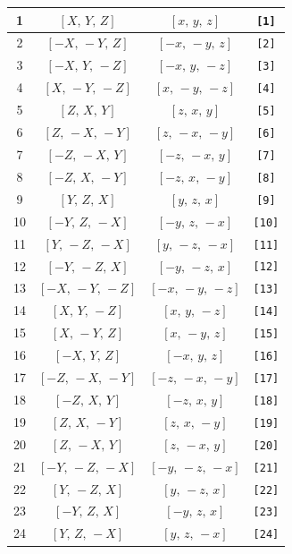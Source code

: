 \documentclass[fleqn,8pt]{jsarticle}
\begin{document}
\begin{longtable}{cccc}
1 & $\left[ X,\, Y,\, Z \right]$ & $\left[ x,\, y,\, z \right]$ & {\tt [1]} \\ \hline
2 & $\left[ - X,\, - Y,\, Z \right]$ & $\left[ - x,\, - y,\, z \right]$ & {\tt [2]} \\ \hline
3 & $\left[ - X,\, Y,\, - Z \right]$ & $\left[ - x,\, y,\, - z \right]$ & {\tt [3]} \\ \hline
4 & $\left[ X,\, - Y,\, - Z \right]$ & $\left[ x,\, - y,\, - z \right]$ & {\tt [4]} \\ \hline
5 & $\left[ Z,\, X,\, Y \right]$ & $\left[ z,\, x,\, y \right]$ & {\tt [5]} \\ \hline
6 & $\left[ Z,\, - X,\, - Y \right]$ & $\left[ z,\, - x,\, - y \right]$ & {\tt [6]} \\ \hline
7 & $\left[ - Z,\, - X,\, Y \right]$ & $\left[ - z,\, - x,\, y \right]$ & {\tt [7]} \\ \hline
8 & $\left[ - Z,\, X,\, - Y \right]$ & $\left[ - z,\, x,\, - y \right]$ & {\tt [8]} \\ \hline
9 & $\left[ Y,\, Z,\, X \right]$ & $\left[ y,\, z,\, x \right]$ & {\tt [9]} \\ \hline
10 & $\left[ - Y,\, Z,\, - X \right]$ & $\left[ - y,\, z,\, - x \right]$ & {\tt [10]} \\ \hline
11 & $\left[ Y,\, - Z,\, - X \right]$ & $\left[ y,\, - z,\, - x \right]$ & {\tt [11]} \\ \hline
12 & $\left[ - Y,\, - Z,\, X \right]$ & $\left[ - y,\, - z,\, x \right]$ & {\tt [12]} \\ \hline
13 & $\left[ - X,\, - Y,\, - Z \right]$ & $\left[ - x,\, - y,\, - z \right]$ & {\tt [13]} \\ \hline
14 & $\left[ X,\, Y,\, - Z \right]$ & $\left[ x,\, y,\, - z \right]$ & {\tt [14]} \\ \hline
15 & $\left[ X,\, - Y,\, Z \right]$ & $\left[ x,\, - y,\, z \right]$ & {\tt [15]} \\ \hline
16 & $\left[ - X,\, Y,\, Z \right]$ & $\left[ - x,\, y,\, z \right]$ & {\tt [16]} \\ \hline
17 & $\left[ - Z,\, - X,\, - Y \right]$ & $\left[ - z,\, - x,\, - y \right]$ & {\tt [17]} \\ \hline
18 & $\left[ - Z,\, X,\, Y \right]$ & $\left[ - z,\, x,\, y \right]$ & {\tt [18]} \\ \hline
19 & $\left[ Z,\, X,\, - Y \right]$ & $\left[ z,\, x,\, - y \right]$ & {\tt [19]} \\ \hline
20 & $\left[ Z,\, - X,\, Y \right]$ & $\left[ z,\, - x,\, y \right]$ & {\tt [20]} \\ \hline
21 & $\left[ - Y,\, - Z,\, - X \right]$ & $\left[ - y,\, - z,\, - x \right]$ & {\tt [21]} \\ \hline
22 & $\left[ Y,\, - Z,\, X \right]$ & $\left[ y,\, - z,\, x \right]$ & {\tt [22]} \\ \hline
23 & $\left[ - Y,\, Z,\, X \right]$ & $\left[ - y,\, z,\, x \right]$ & {\tt [23]} \\ \hline
24 & $\left[ Y,\, Z,\, - X \right]$ & $\left[ y,\, z,\, - x \right]$ & {\tt [24]} \\
\end{longtable}
\end{document}
